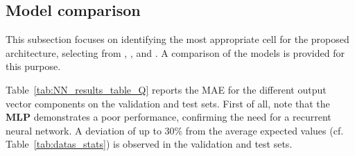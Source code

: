 


\subsection{Model comparison}\label{sec:nn_comparaison_quad}



This subsection focuses on identifying the most appropriate  cell for the proposed architecture, selecting from , , and .
A comparison of the models is provided for this purpose.

Table~\ref{tab:NN_results_table_Q} reports the MAE for the different output vector components on the validation and test sets. 
First of all, note that the \textbf{MLP} demonstrates a poor performance, confirming the need for a recurrent neural network.
A deviation of up to 30\% from the average expected values (cf. Table~\ref{tab:datas_stats}) is observed in the validation and test sets.

